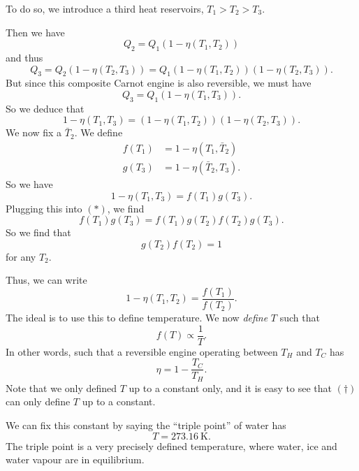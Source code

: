\documentclass[a4paper]{article}
\begin{document}
To do so, we introduce a third heat reservoirs, $T_1 > T_2 > T_3$.
\begin{center}
\end{center}
Then we have
\[
  Q_2 = Q_1 (1 - \eta(T_1, T_2))
\]
and thus
\[
  Q_3 = Q_2( 1 - \eta(T_2, T_3)) = Q_1(1 - \eta(T_1, T_2))(1 - \eta(T_2, T_3)).
\]
But since this composite Carnot engine is also reversible, we must have
\[
  Q_3 = Q_1(1 - \eta(T_1, T_3)).
\]
So we deduce that
\[
  1 - \eta(T_1, T_3) = (1 - \eta(T_1, T_2))( 1 - \eta(T_2, T_3)).\tag{$*$}
\]
We now fix a $\bar{T}_2$. We define
\begin{align*}
  f(T_1) &= 1 - \eta(T_1, \bar{T}_2)\\
  g(T_3) &= 1 - \eta(\bar{T}_2, T_3).
\end{align*}
So we have
\[
  1 - \eta(T_1, T_3) = f(T_1) g(T_3).
\]
Plugging this into $(*)$, we find
\[
  f(T_1) g(T_3) = f(T_1) g(T_2) f(T_2) g(T_3).
\]
So we find that
\[
  g(T_2) f(T_2) = 1
\]
for any $T_2$.

Thus, we can write
\[
  1 - \eta(T_1, T_2) = \frac{f(T_1)}{f(T_2)}.
\]
The ideal is to use this to define temperature. We now \emph{define} $T$ such that
\[
  f(T) \propto \frac{1}{T}.
\]
In other words, such that a reversible engine operating between $T_H$ and $T_C$ has
\[
  \eta = 1 - \frac{T_C}{T_H}.\tag{$\dagger$}
\]
Note that we only defined $T$ up to a constant only, and it is easy to see that $(\dagger)$ can only define $T$ up to a constant.

We can fix this constant by saying the ``triple point'' of water has
\[
  T = \SI{273.16}{\kelvin}.
\]
The triple point is a very precisely defined temperature, where water, ice and water vapour are in equilibrium.
\end{document}
